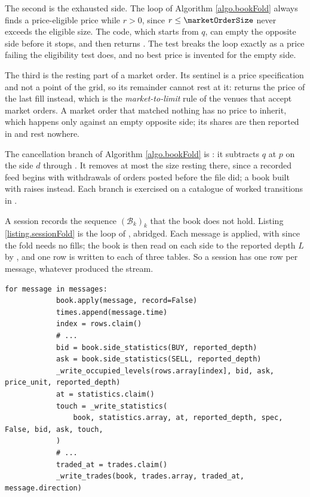 The second is the exhausted side.
The loop of Algorithm \ref{algo.bookFold} always finds a price-eligible price while $r>0$,
since $r \leq \marketOrderSize$ never exceeds the eligible size.
The code, which starts from $q$, can empty the opposite side before it stops,
and  then returns .
The test  breaks the loop exactly as a price failing the eligibility test
does, and no best price is invented for the empty side.

The third is the resting part of a market order.
Its sentinel is a price specification and not a point of the grid,
so its remainder cannot rest at it:
 returns the price of the last fill instead,
which is the \emph{market-to-limit} rule of the venues that accept market orders.
A market order that matched nothing has no price to inherit,
which happens only against an empty opposite side;
its shares are then reported in  and rest nowhere.

The cancellation branch of Algorithm \ref{algo.bookFold} is :
it subtracts $q$ at $p$ on the side $d$ through .
It removes at most the size resting there,
since a recorded feed begins with withdrawals of orders posted before the file did;
a book built with  raises instead.
Each branch is exercised on a catalogue of worked transitions in
.

A session records the sequence $(\mathcal{B}_k)_k$ that the book does not hold.
Listing \ref{listing.sessionFold} is the loop of ,
abridged.
Each message is applied, with  since the fold needs no fills;
the book is then read on each side to the reported depth $L$ by ,
and one row is written to each of three tables.
So a session has one row per message, whatever produced the stream.

\begin{lstlisting}[caption={\protect\codehl{unito26.lob.session.MarketSession.from\_occupied\_levels}: the loop of the fold, abridged.}, label=listing.sessionFold]
        for message in messages:
            book.apply(message, record=False)
            times.append(message.time)
            index = rows.claim()
            # ...
            bid = book.side_statistics(BUY, reported_depth)
            ask = book.side_statistics(SELL, reported_depth)
            _write_occupied_levels(rows.array[index], bid, ask, price_unit, reported_depth)
            at = statistics.claim()
            touch = _write_statistics(
                book, statistics.array, at, reported_depth, spec, False, bid, ask, touch,
            )
            # ...
            traded_at = trades.claim()
            _write_trades(book, trades.array, traded_at, message.direction)
\end{lstlisting}


